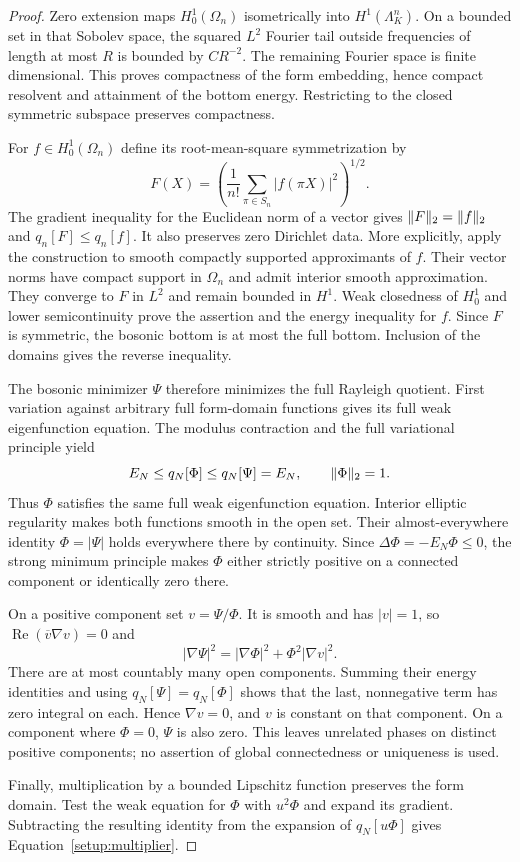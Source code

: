 \begin{proof}
Zero extension maps $H_0^1(\Omega_n)$ isometrically into
$H^1(\Lambda_K^n)$. On a bounded set in that Sobolev space, the squared
$L^2$ Fourier tail outside frequencies of length at most $R$ is bounded
by $C R^{-2}$. The remaining Fourier space is finite dimensional. This
proves compactness of the form embedding, hence compact resolvent and
attainment of the bottom energy. Restricting to the closed symmetric
subspace preserves compactness.

For $f\in H_0^1(\Omega_n)$ define its root-mean-square symmetrization by
\[
 F(X)=\left(\frac1{n!}\sum_{\pi\in S_n}|f(\pi X)|^2\right)^{1/2}.
\]
The gradient inequality for the Euclidean norm of a vector gives
$\lVert F\rVert_2=\lVert f\rVert_2$ and $q_n[F]\le q_n[f]$. It also preserves
zero Dirichlet data. More explicitly, apply the construction to smooth
compactly supported approximants of $f$. Their vector norms have compact
support in $\Omega_n$ and admit interior smooth approximation. They
converge to $F$ in $L^2$ and remain bounded in $H^1$. Weak closedness of
$H_0^1$ and lower semicontinuity prove the assertion and the energy
inequality for $f$. Since $F$ is symmetric, the bosonic bottom is at
most the full bottom. Inclusion of the domains gives the reverse
inequality.

The bosonic minimizer $\Psi$ therefore minimizes the full Rayleigh
quotient. First variation against arbitrary full form-domain functions
gives its full weak eigenfunction equation. The modulus contraction and
the full variational principle yield
\[
 E_N\le q_N[\Phi]\le q_N[\Psi]=E_N,
 \qquad \lVert\Phi\rVert_2=1.
\]
Thus $\Phi$ satisfies the same full weak eigenfunction equation.
Interior elliptic regularity makes both functions smooth in the open
set. Their almost-everywhere identity $\Phi=|\Psi|$ holds everywhere
there by continuity. Since $\Delta\Phi=-E_N\Phi\le0$, the strong
minimum principle makes $\Phi$ either strictly positive on a connected
component or identically zero there.

On a positive component set $v=\Psi/\Phi$. It is smooth and has
$|v|=1$, so $\operatorname{Re}(\overline v\nabla v)=0$ and
\[
 |\nabla\Psi|^2=|\nabla\Phi|^2+\Phi^2|\nabla v|^2.
\]
There are at most countably many open components. Summing their energy
identities and using $q_N[\Psi]=q_N[\Phi]$ shows that the last,
nonnegative term has zero integral on each. Hence $\nabla v=0$, and
$v$ is constant on that component. On a component where $\Phi=0$,
$\Psi$ is also zero. This leaves unrelated phases on distinct positive
components; no assertion of global connectedness or uniqueness is used.

Finally, multiplication by a bounded Lipschitz function preserves the
form domain. Test the weak equation for $\Phi$ with $u^2\Phi$ and
expand its gradient. Subtracting the resulting identity from the
expansion of $q_N[u\Phi]$ gives Equation~\eqref{setup:multiplier}.
\end{proof}

